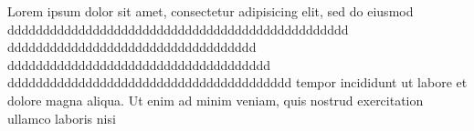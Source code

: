 


Lorem ipsum dolor sit amet, consectetur adipisicing elit, sed do eiusmod
dddddddddddddddddddddddddddddddddddddddddddddddd
ddddddddddddddddddddddddddddddddddd
ddddddddddddddddddddddddddddddddddddd
dddddddddddddddddddddddddddddddddddddddd
tempor incididunt ut labore et dolore magna aliqua. Ut enim ad minim
veniam, quis nostrud exercitation ullamco laboris nisi

\bye
